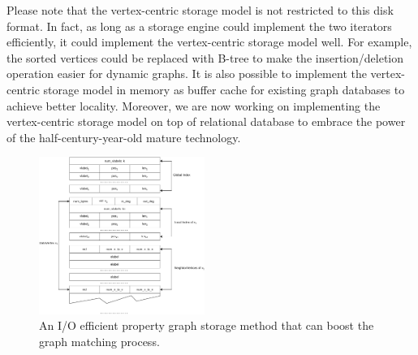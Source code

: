 Please note that the vertex-centric storage model is not restricted to this disk format.
In fact, as long as a storage engine could implement the two iterators efficiently,
it could implement the vertex-centric storage model well.
For example, the sorted vertices could be replaced with B-tree to make the insertion/deletion operation easier for dynamic graphs.
It is also possible to implement the vertex-centric storage model in memory as buffer cache for existing graph databases to achieve better locality.
Moreover, we are now working on implementing the vertex-centric storage model on top of relational database to embrace the power of the half-century-year-old mature technology.
\begin{figure}[ht]
  \centering
  \includegraphics[width=0.48\textwidth]{img/data_graph.pdf}
  \caption{An I/O efficient property graph storage method that can boost the graph matching process.}\label{img:data_graph}
\end{figure}
